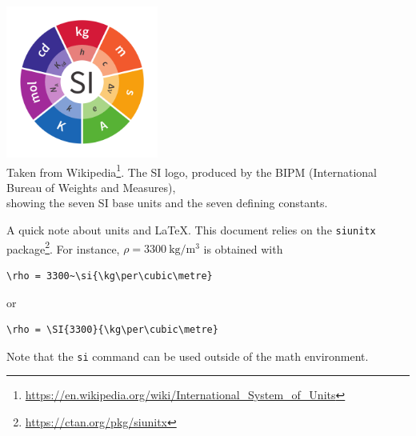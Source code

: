 \begin{center}
\includegraphics[width=5cm]{images/siunits}\\
{\captionfont Taken from 
Wikipedia\footnote{\url{https://en.wikipedia.org/wiki/International_System_of_Units}}.
The SI logo, produced by the BIPM (International Bureau of Weights and Measures), \\
showing the seven SI base units and the seven defining constants.}
\end{center}

A quick note about units and \LaTeX. This document relies on the {\tt siunitx} 
package\footnote{\url{https://ctan.org/pkg/siunitx}}. For instance, 
$\rho = 3300~\si{\kg\per\cubic\metre}$ is obtained with 
\begin{verbatim}
\rho = 3300~\si{\kg\per\cubic\metre}
\end{verbatim}
or
\begin{verbatim}
\rho = \SI{3300}{\kg\per\cubic\metre}
\end{verbatim}
Note that the {\tt si} command can be used outside of the math environment. 
